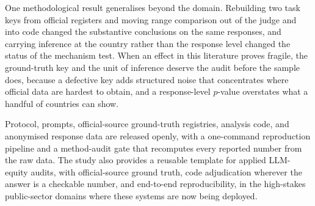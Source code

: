 One methodological result generalises beyond the domain. Rebuilding two task
keys from official registers and moving range comparison out of the judge and
into code changed the substantive conclusions on the same responses, and
carrying inference at the country rather than the response level changed the
status of the mechanism test. When an effect in this literature proves
fragile, the ground-truth key and the unit of inference deserve the audit
before the sample does, because a defective key adds structured noise that
concentrates where official data are hardest to obtain, and a response-level
$p$-value overstates what a handful of countries can show.

Protocol, prompts, official-source ground-truth registries, analysis code, and
anonymised response data are released openly, with a one-command reproduction
pipeline and a method-audit gate that recomputes every reported number from the
raw data. The study also provides a reusable template for applied LLM-equity
audits, with official-source ground truth, code adjudication wherever the
answer is a checkable number, and end-to-end reproducibility, in the
high-stakes public-sector domains where these systems are now being deployed.
